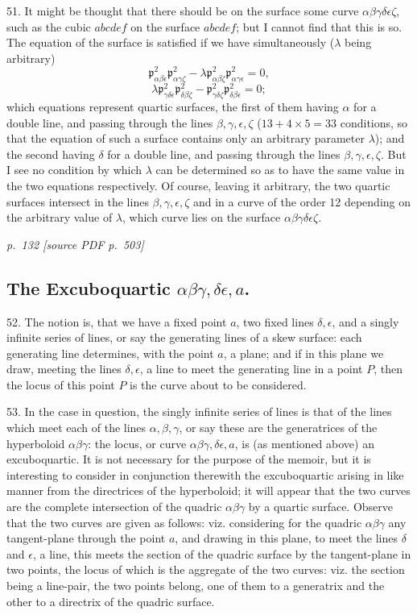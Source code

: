 \documentclass[11pt,a4paper]{article}
\newcommand{\sourcepage}[2]{%
  \bigskip
  \noindent\textit{p.~#1 [source PDF p.~#2]}%
  \par\smallskip
}
\newcommand{\p}{\mathfrak p}
\newcommand{\surf}[1]{\par\smallskip\noindent{\itshape \{Surface $#1$.\}}\par\smallskip}
\begin{document}
51. It might be thought that there should be on the surface some curve
$\alpha\beta\gamma\delta\epsilon\zeta$, such as the cubic $abcdef$ on the surface
$abcdef$; but I cannot find that this is so. The equation of the surface is satisfied
if we have simultaneously ($\lambda$ being arbitrary)
\[
\p^2_{\alpha\beta\epsilon}\p^2_{\alpha\gamma\zeta}
-\lambda\p^2_{\alpha\beta\zeta}\p^2_{\alpha\gamma\epsilon}=0,
\]
\[
\lambda\p^2_{\gamma\delta\epsilon}\p^2_{\delta\beta\zeta}
-\p^2_{\gamma\delta\zeta}\p^2_{\delta\beta\epsilon}=0;
\]
which equations represent quartic surfaces, the first of them having $\alpha$ for a
double line, and passing through the lines $\beta,\gamma,\epsilon,\zeta$
($13+4\times5=33$ conditions, so that the equation of such a surface contains only
an arbitrary parameter $\lambda$); and the second having $\delta$ for a double line,
and passing through the lines $\beta,\gamma,\epsilon,\zeta$. But I see no condition
by which $\lambda$ can be determined so as to have the same value in the two
equations respectively. Of course, leaving it arbitrary, the two quartic surfaces
intersect in the lines $\beta,\gamma,\epsilon,\zeta$ and in a curve of the order 12
depending on the arbitrary value of $\lambda$, which curve lies on the surface
$\alpha\beta\gamma\delta\epsilon\zeta$.
\surf{\alpha\beta\gamma\delta\epsilon\zeta}

\sourcepage{132}{503}
\subsection*{The Excuboquartic \(\alpha\beta\gamma,\delta\epsilon,a\).}

52. The notion is, that we have a fixed point $a$, two fixed lines $\delta,\epsilon$,
and a singly infinite series of lines, or say the generating lines of a skew surface:
each generating line determines, with the point $a$, a plane; and if in this plane
we draw, meeting the lines $\delta,\epsilon$, a line to meet the generating line in a
point $P$, then the locus of this point $P$ is the curve about to be considered.

53. In the case in question, the singly infinite series of lines is that of the lines
which meet each of the lines $\alpha,\beta,\gamma$, or say these are the generatrices
of the hyperboloid $\alpha\beta\gamma$: the locus, or curve
$\alpha\beta\gamma,\delta\epsilon,a$, is (as mentioned above) an excuboquartic. It
is not necessary for the purpose of the memoir, but it is interesting to consider in
conjunction therewith the excuboquartic arising in like manner from the directrices
of the hyperboloid; it will appear that the two curves are the complete intersection
of the quadric $\alpha\beta\gamma$ by a quartic surface. Observe that the two curves
are given as follows: viz. considering for the quadric $\alpha\beta\gamma$ any
tangent-plane through the point $a$, and drawing in this plane, to meet the lines
$\delta$ and $\epsilon$, a line, this meets the section of the quadric surface by the
tangent-plane in two points, the locus of which is the aggregate of the two curves:
viz. the section being a line-pair, the two points belong, one of them to a generatrix
and the other to a directrix of the quadric surface.
\end{document}
